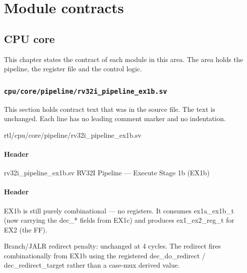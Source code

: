 \part{Module contracts}\label{ds:part:module-contracts}

\chapter{CPU core}\label{ds:ch:mod-cpu-core}

This chapter states the contract of each module in this area. The area holds the pipeline, the register file and the control logic.

\section{\texttt{cpu/core/pipeline/rv32i\_pipeline\_ex1b.sv}}\label{ds:mod:rv32i-pipeline-ex1b}

This section holds contract text that was in the source file. The text is unchanged. Each line has no leading comment marker and no indentation.

\begin{relocated}{rtl/cpu/core/pipeline/rv32i_pipeline_ex1b.sv}

\subsection*{Header}

\begin{textblock}
rv32i_pipeline_ex1b.sv
RV32I Pipeline — Execute Stage 1b (EX1b)
\end{textblock}

\subsection*{Header}

\begin{textblock}
EX1b is still purely combinational — no registers.  It consumes
ex1a_ex1b_t (now carrying the dec_* fields from EX1c) and produces
ex1_ex2_reg_t for EX2 (the FF).

Branch/JALR redirect penalty: unchanged at 4 cycles.  The redirect fires
combinationally from EX1b using the registered dec_do_redirect /
dec_redirect_target rather than a case-mux derived value.
\end{textblock}

\end{relocated}

